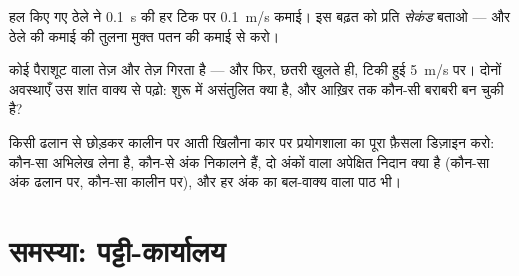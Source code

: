 \begin{exercise}[$\star\star$]\label{exo:g9:uniform-varied-motion:10}
हल किए गए ठेले ने \qty{0.1}{s} की हर टिक पर \qty{0.1}{m/s} कमाई।
इस बढ़त को प्रति \emph{सेकंड} बताओ --- और ठेले की कमाई की तुलना मुक्त
पतन की कमाई से करो।
\end{exercise}

\begin{exercise}[$\star\star$]\label{exo:g9:uniform-varied-motion:11}
कोई पैराशूट वाला तेज़ और तेज़ गिरता है --- और फिर, छतरी खुलते ही, टिकी
हुई \qty{5}{m/s} पर। दोनों अवस्थाएँ उस शांत वाक्य से पढ़ो: शुरू में
असंतुलित क्या है, और आख़िर तक कौन-सी बराबरी बन चुकी है?
\end{exercise}

\begin{exercise}[$\star\star\star$]\label{exo:g9:uniform-varied-motion:12}
किसी ढलान से छोड़कर कालीन पर आती खिलौना कार पर प्रयोगशाला का पूरा
फ़ैसला डिज़ाइन करो: कौन-सा अभिलेख लेना है, कौन-से अंक निकालने हैं, दो
अंकों वाला अपेक्षित निदान क्या है (कौन-सा अंक ढलान पर, कौन-सा कालीन
पर), और हर अंक का बल-वाक्य वाला पाठ भी।
\end{exercise}

\section{समस्या: पट्टी-कार्यालय}

